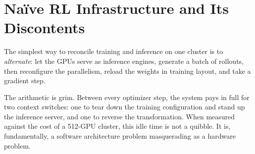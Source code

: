 \documentclass[11pt,a4paper]{article}
\theoremstyle{definition}
\theoremstyle{plain}
\begin{document}
\section{Na\"ive RL Infrastructure and Its Discontents}

The simplest way to reconcile training and inference on one cluster is to \emph{alternate}: let the GPUs serve as inference engines, generate a batch of rollouts, then reconfigure the parallelism, reload the weights in training layout, and take a gradient step.

\begin{center}
\end{center}

The arithmetic is grim. Between every optimizer step, the system pays in full for two context switches: one to tear down the training configuration and stand up the inference server, and one to reverse the transformation. When measured against the cost of a 512-GPU cluster, this idle time is not a quibble. It is, fundamentally, a software architecture problem masquerading as a hardware problem.

\end{document}
